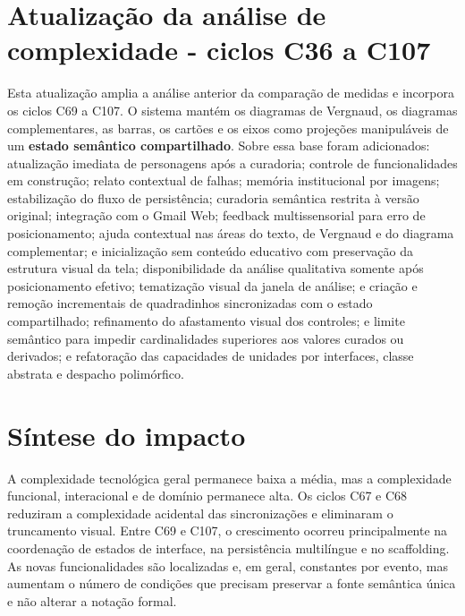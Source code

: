 \documentclass[12pt,a4paper]{article}
\begin{document}
\section*{Atualização da análise de complexidade - ciclos C36 a C107}

Esta atualização amplia a análise anterior da comparação de medidas e incorpora os ciclos C69 a C107. O sistema mantém os diagramas de Vergnaud, os diagramas complementares, as barras, os cartões e os eixos como projeções manipuláveis de um \textbf{estado semântico compartilhado}. Sobre essa base foram adicionados: atualização imediata de personagens após a curadoria; controle de funcionalidades em construção; relato contextual de falhas; memória institucional por imagens; estabilização do fluxo de persistência; curadoria semântica restrita à versão original; integração com o Gmail Web; feedback multissensorial para erro de posicionamento; ajuda contextual nas áreas do texto, de Vergnaud e do diagrama complementar; e inicialização sem conteúdo educativo com preservação da estrutura visual da tela; disponibilidade da análise qualitativa somente após posicionamento efetivo; tematização visual da janela de análise; e criação e remoção incrementais de quadradinhos sincronizadas com o estado compartilhado; refinamento do afastamento visual dos controles; e limite semântico para impedir cardinalidades superiores aos valores curados ou derivados; e refatoração das capacidades de unidades por interfaces, classe abstrata e despacho polimórfico.

\section{Síntese do impacto}

A complexidade tecnológica geral permanece baixa a média, mas a complexidade funcional, interacional e de domínio permanece alta. Os ciclos C67 e C68 reduziram a complexidade acidental das sincronizações e eliminaram o truncamento visual. Entre C69 e C107, o crescimento ocorreu principalmente na coordenação de estados de interface, na persistência multilíngue e no scaffolding. As novas funcionalidades são localizadas e, em geral, constantes por evento, mas aumentam o número de condições que precisam preservar a fonte semântica única e não alterar a notação formal.
\end{document}
